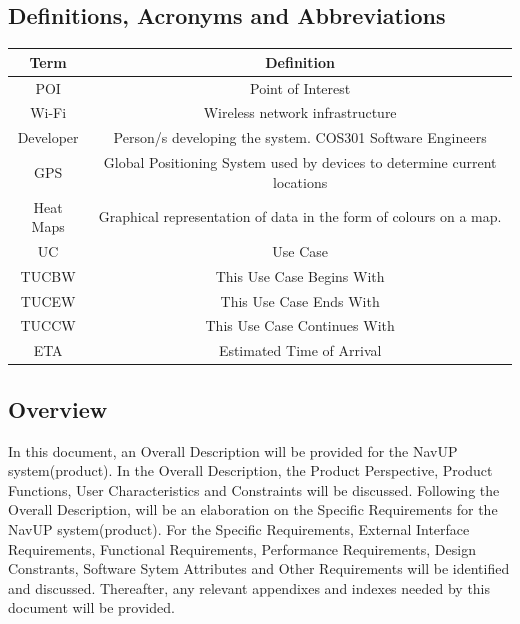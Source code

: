 ﻿\documentclass{article}
\begin{document}
    \subsection{Definitions, Acronyms and Abbreviations}
        \begin{table}[h!]
            \centering
            \begin{tabular}{|c|c|}
            \hline
            Term & Definition \\
            \hline
            POI & Point of Interest \\
            \hline
            Wi-Fi & Wireless network infrastructure \\
            \hline
            Developer & Person/s developing the system. COS301 Software Engineers
            \\
            \hline
            GPS & Global Positioning System used by devices to determine current locations
            \\
            \hline
            Heat Maps & Graphical representation of data in the form of colours on a map.
            \\
				  \hline
            UC & Use Case
            \\
 				\hline
            TUCBW & This Use Case Begins With
            \\
			   \hline
            TUCEW & This Use Case Ends With
            \\
 				\hline
            TUCCW & This Use Case Continues With
            \\
				 \hline
            ETA & Estimated Time of Arrival
            \\
            \hline
            \end{tabular}
        \end{table}
    \subsection{Overview}
		\begin{flushleft}
			In this document, an Overall Description will be provided for the NavUP system(product). In the Overall Description, the Product Perspective, Product Functions, User Characteristics and Constraints will be discussed. Following the Overall Description, will be an elaboration on the Specific Requirements for the NavUP system(product). For the Specific Requirements, External Interface Requirements, Functional Requirements, Performance Requirements, Design Constrants, Software Sytem Attributes and Other Requirements will be identified and discussed.
Thereafter, any relevant appendixes and indexes needed by this document will be provided.
		\end{flushleft}
\end{document}
